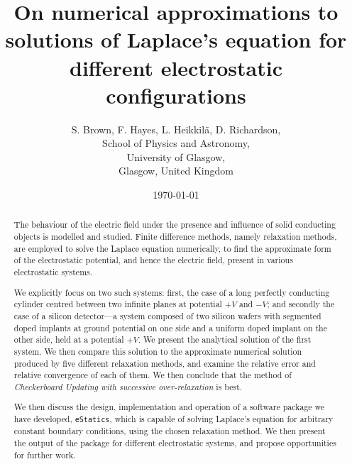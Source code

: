 \documentclass[12pt, a4paper]{article}
\begin{document}
\title{On numerical approximations to solutions of Laplace's equation for different
electrostatic configurations}
\author{S. Brown, F. Hayes, L. Heikkil{\"a}, D. Richardson,\\
	School of Physics and Astronomy,\\
	University of Glasgow,\\
	Glasgow, United Kingdom}
\date{\today}
\maketitle

\begin{abstract}

The behaviour of the electric field under the presence and influence of solid
conducting objects is modelled and studied. Finite difference methods, namely
relaxation methods, are employed to solve the Laplace equation numerically,
to find the approximate form of the electrostatic potential, and hence the electric
field, present in various electrostatic systems.

We explicitly focus on two such systems: first, the case of a long perfectly conducting
cylinder centred between two infinite planes at potential $+V$ and $-V$; and secondly 
the case of a silicon detector---a system composed of two silicon wafers with segmented
doped implants at ground potential on one side and a uniform doped implant on the
other side, held at a potential $+V$. We present the analytical solution of the first
system. We then compare this solution to the approximate numerical solution produced
by five different relaxation methods, and examine the relative error and relative
convergence of each of them. We then conclude that the method of 
\emph{Checkerboard Updating with successive over-relaxation} is best.

We then discuss the design, implementation and operation of a software package we have
developed, \lstinline|eStatics|, which is capable of solving Laplace's equation for arbitrary
constant boundary conditions, using the chosen relaxation method. We then present the
output of the package for different electrostatic systems, and propose opportunities
for further work.

\end{abstract}

\newpage                       %
\tableofcontents               %
\newpage                       %
\end{document}
